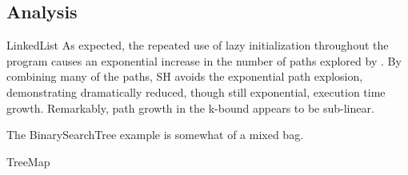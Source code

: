\subsection{Analysis}

LinkedList
As expected, the repeated use of lazy initialization throughout the program causes an exponential increase in the number of paths explored by \gsetxt{}. By combining many of the \gsetxt{} paths, SH avoids the exponential path explosion, demonstrating dramatically reduced, though still exponential, execution time growth. Remarkably, path growth in the k-bound appears to be sub-linear.

The BinarySearchTree example is somewhat of a mixed bag. 

TreeMap

